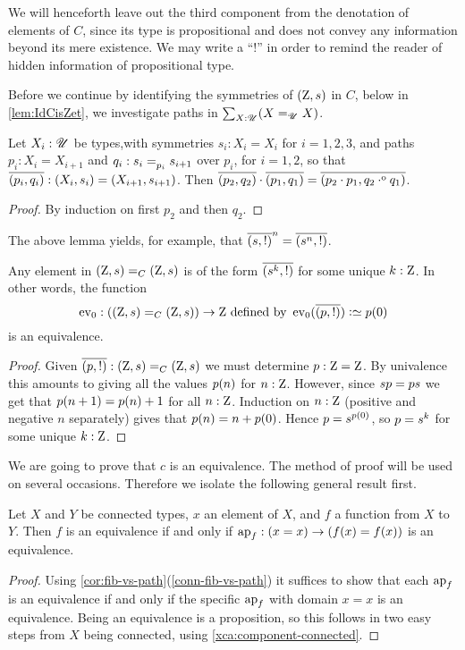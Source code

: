 We will henceforth leave out the third component from the denotation
of elements of $C$, since its type is propositional and does not convey 
any information beyond its mere existence. We may write a ``!'' in order
to remind the reader of hidden information of propositional type.

Before we continue by identifying the symmetries of $(\mathrm{Z},{s})$ in $C$,
below in \cref{lem:IdCisZet}, we investigate paths in $\sum_{X:{\mathscr{U}}}(X=_{{\mathscr{U}}}X)$.

\begin{lemma}\label{lem:path-in-sum-X:U-X=X}
Let $X_i:{\mathscr{U}}$ be types,with symmetries $s_i: X_i = X_i$ for $i=1,2,3$, and 
paths $p_i : X_i = X_{i+1}$ and $q_i : \pathover {s_i}{}{p_i}{s_{i+1}}$ over $p_i$, 
for $i=1,2$, so that $\overline{({p_i},{q_i})} : (X_i,s_i) = (X_{i+1},s_{i+1})$.
Then $\overline{({p_2},{q_2})} \cdot \overline{({p_1},{q_1})} = \overline{({p_2 \cdot p_1},{q_2 \cdot^{\mathrm{o}} q_1})} $.
\end{lemma}
\begin{proof}
By induction on first $p_2$ and then $q_2$.
\end{proof}

The above lemma yields, for example, that $\overline{({{s}},{!})} ^n = \overline{({{s}^n},{!})}$.

\begin{lemma}
  \label{lem:IdCisZet}
Any element in $(\mathrm{Z},{s})=_C(\mathrm{Z},{s})$ is of 
the form $\overline{({{s}^k},{!})}$ for some unique $k:\mathrm{Z}$.  
In other words, the function 
\[
\ev_0:((\zet,\etop{s})=_C(\zet,\etop{s}))\to \zet 
\text{~defined by~} \ev_0(\pathpair{p}{!}) \defeq \ptoe{p}(0)
\]
is an equivalence.
\end{lemma}
\begin{proof}
  Given $\overline{({p},{!})}:(\mathrm{Z},{s})=_C(\mathrm{Z},{s})$ we must determine 
$p:\mathrm{Z}=\mathrm{Z}$. By univalence this amounts to giving all the values 
${p}(n)$ for $n:\mathrm{Z}$.  However, since $s{p}={p}s$ we 
get that ${p}(n+1)={p}(n)+1$ for all $n:\mathrm{Z}$. 
Induction on $n:\mathrm{Z}$ (positive and negative $n$ separately) gives that 
${p}(n)=n+{p}(0)$. Hence ${p}=s^{{p}(0)}$, so $p={s}^k$
for some unique $k:\mathrm{Z}$.
\end{proof}

We are going to prove that $c$ is an equivalence.
The method of proof will be used on several occasions.
Therefore we isolate the following general result first.

\begin{lemma}\label{lem:conn-eq-f-ap-f-x}
Let $X$ and $Y$ be connected types, $x$ an element of $X$,
and $f$ a function from $X$ to $Y$. Then $f$ is an equivalence
if and only if $\ap{f}: (x=x) \to (f(x)=f(x))$ is an equivalence.
\end{lemma} 
\begin{proof}
Using \cref{cor:fib-vs-path}(\ref{conn-fib-vs-path}) it suffices to show that 
each $\ap{f}$ is an equivalence if and only if the specific $\ap{f}$ with 
domain $x=x$ is an equivalence. Being an equivalence is a proposition, 
so this follows in two easy steps from $X$ being connected,
using \cref{xca:component-connected}.
\end{proof}

